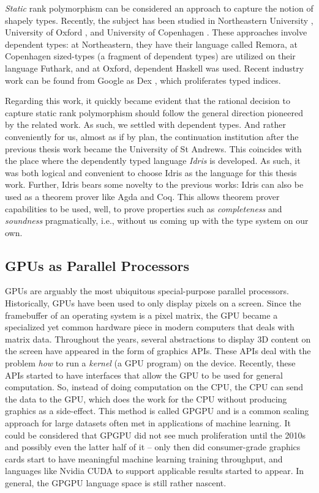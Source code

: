 \documentclass{report}
\begin{document}
\emph{Static} rank polymorphism can be considered an approach to capture the notion of shapely types. Recently, the subject has been studied in Northeastern University \cite{slepak2014array, slepak2019semantics, shivers2019introduction}, University of Oxford \cite{gibbons2017aplicative}, and University of Copenhagen \cite{henriksen:phdthesis}. These approaches involve dependent types: at Northeastern, they have their language called Remora, at Copenhagen sized-types (a fragment of dependent types) are utilized on their language Futhark, and at Oxford, dependent Haskell was used. Recent industry work can be found from Google as Dex \cite{paszke2021getting}, which proliferates typed indices.

Regarding this work, it quickly became evident that the rational decision to capture static rank polymorphism should follow the general direction pioneered by the related work. As such, we settled with dependent types. And rather conveniently for us, almost as if by plan, the continuation institution after the previous thesis work became the University of St Andrews. This coincides with the place where the dependently typed language \emph{Idris} is developed. As such, it was both logical and convenient to choose Idris as the language for this thesis work. Further, Idris bears some novelty to the previous works: Idris can also be used as a theorem prover like Agda and Coq. This allows theorem prover capabilities to be used, well, to prove properties such as \emph{completeness} and \emph{soundness} pragmatically, i.e., without us coming up with the type system on our own.

\subsection{GPUs as Parallel Processors}

GPUs are arguably the most ubiquitous special-purpose parallel processors. Historically, GPUs have been used to only display pixels on a screen. Since the framebuffer of an operating system is a pixel matrix, the GPU became a specialized yet common hardware piece in modern computers that deals with matrix data. Throughout the years, several abstractions to display 3D content on the screen have appeared in the form of graphics \glspl{API}. These APIs deal with the problem \emph{how} to run a \emph{kernel} (a GPU program) on the device. Recently, these APIs started to have interfaces that allow the GPU to be used for general computation. So, instead of doing computation on the CPU, the CPU can send the data to the GPU, which does the work for the CPU without producing graphics as a side-effect. This method is called \gls{GPGPU} and is a common scaling approach for large datasets often met in applications of machine learning. It could be considered that GPGPU did not see much proliferation until the 2010s and possibly even the latter half of it -- only then did consumer-grade graphics cards start to have meaningful machine learning training throughput, and languages like Nvidia CUDA to support applicable results started to appear. In general, the GPGPU language space is still rather nascent.
\end{document}
